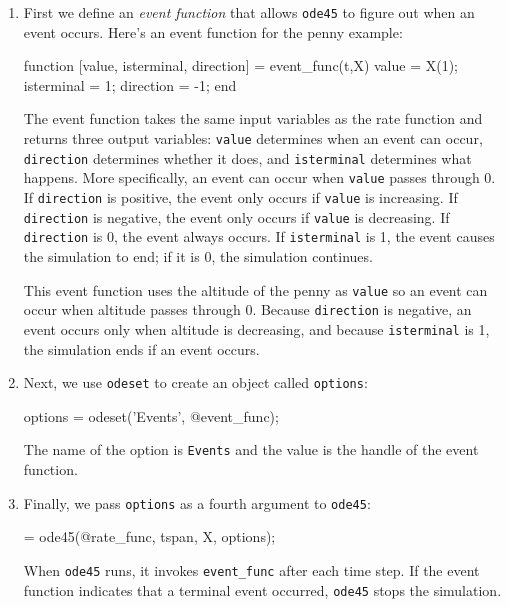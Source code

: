 \begin{enumerate}

\item First we define an \emph{event function} that allows \lstinline{ode45} to figure out when
an event occurs.  Here's an event function for the penny example:

\begin{code}
function [value, isterminal, direction] = event_func(t,X)
    value = X(1);
    isterminal = 1;
    direction = -1;
end
\end{code}

The event function takes the same input variables as the rate function and returns three output variables: \lstinline{value} determines when an event can occur, \lstinline{direction} determines whether it does, and \lstinline{isterminal} determines what happens.
More specifically, an event can occur when \lstinline{value} passes through 0.
If \lstinline{direction} is positive, the event only occurs if \lstinline{value} is increasing.
 If \lstinline{direction} is negative, the event only occurs if \lstinline{value} is decreasing.
If \lstinline{direction} is 0, the event always occurs.
If \lstinline{isterminal} is 1, the event causes the simulation to end; if it is 0, the simulation continues.

This event function uses the altitude of the penny as \lstinline{value} so an event can occur when altitude passes through 0.  
Because \lstinline{direction} is negative, an event occurs only when altitude is decreasing, and
because \lstinline{isterminal} is 1, the simulation ends if an event occurs.


\item Next, we use \lstinline{odeset} to create an object called \lstinline{options}:

\begin{code}
options = odeset('Events', @event_func);
\end{code}
%
The name of the option is \lstinline{Events} and the value is the handle of the event function.  

\item Finally, we pass \lstinline{options} as a fourth argument to \lstinline{ode45}:

\begin{code}
[T, M] = ode45(@rate_func, tspan, X, options);
\end{code}

When \lstinline{ode45} runs, it invokes \lstinline{event_func} after each time step.  If the event function indicates that a terminal event occurred, 
\lstinline{ode45} stops the simulation.

\end{enumerate}

